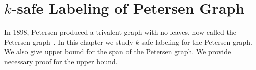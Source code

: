 \chapter{$k$-safe Labeling of Petersen Graph}\label{safeklabelingpetersen}

In 1898, Petersen produced a trivalent graph with no leaves, now
called the Petersen graph~\cite{holton1993petersen}.  In this chapter
we study $k$-safe labeling for the Petersen graph. We also give upper
bound for the span of the Petersen graph. We provide necessary proof
for the upper bound.

\endinput

